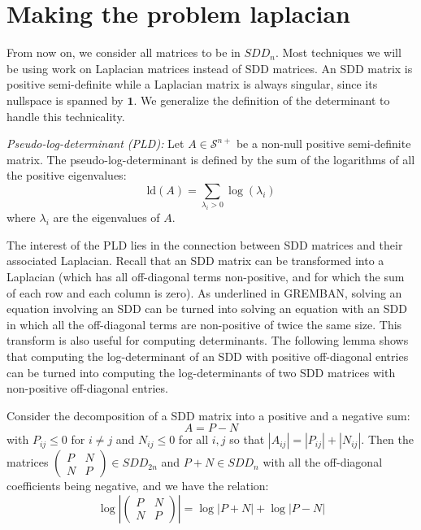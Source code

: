 
\section{Making the problem laplacian}

\label{sec:Making-the-problem}

From now on, we consider all matrices to be in $SDD_{n}$. Most techniques
we will be using work on Laplacian matrices instead of SDD matrices.
An SDD matrix is positive semi-definite while a Laplacian matrix is
always singular, since its nullspace is spanned by $\mathbf{1}$.
We generalize the definition of the determinant to handle this technicality. 

\begin{definition} \emph{Pseudo-log-determinant (PLD):} Let $A\in\mathcal{S}^{n+}$
be a non-null positive semi-definite matrix. The pseudo-log-determinant
is defined by the sum of the logarithms of all the positive eigenvalues:
\[
\text{ld}\left(A\right)=\sum_{\lambda_{i}>0}\log\left(\lambda_{i}\right)
\]
where $\lambda_{i}$ are the eigenvalues of $A$. \end{definition}

The interest of the PLD lies in the connection between SDD matrices
and their associated Laplacian. Recall that an SDD matrix can be transformed
into a Laplacian (which has all off-diagonal terms non-positive, and
for which the sum of each row and each column is zero). As underlined
in GREMBAN, solving an equation involving an SDD can be turned into
solving an equation with an SDD in which all the off-diagonal terms
are non-positive of twice the same size. This transform is also useful
for computing determinants. The following lemma shows that computing
the log-determinant of an SDD with positive off-diagonal entries can
be turned into computing the log-determinants of two SDD matrices
with non-positive off-diagonal entries.

\begin{lemma}\label{non-negative-conversion}Consider the decomposition
of a SDD matrix into a positive and a negative sum:
\[
A=P-N
\]
with $P_{ij}\leq0$ for $i\neq j$ and $N_{ij}\leq0$ for all $i,j$
so that $\left|A_{ij}\right|=\left|P_{ij}\right|+\left|N_{ij}\right|$.
Then the matrices $\left(\begin{array}{cc}
P & N\\
N & P
\end{array}\right)\in SDD_{2n}$ and $P+N\in SDD_{n}$ with all the off-diagonal coefficients being
negative, and we have the relation:
\[
\log\left|\left(\begin{array}{cc}
P & N\\
N & P
\end{array}\right)\right|=\log\left|P+N\right|+\log\left|P-N\right|
\]


\end{lemma}

